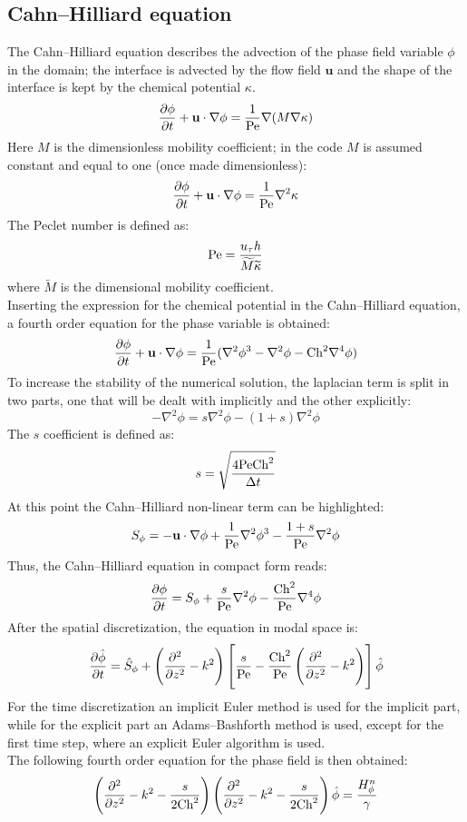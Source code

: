 \subsection{Cahn--Hilliard equation}
The Cahn--Hilliard equation describes the advection of the phase field variable $\phi$ in the domain; the interface is advected by the flow field $\mathbf{u}$ and the shape of the interface is kept by the chemical potential $\kappa$.
\begin{equation}
\frac{\partial \phi}{\partial t}+\mathbf{u}\cdot\nabla\phi=\frac{1}{\textnormal{Pe}}\nabla(M\nabla\kappa)
\end{equation}
Here $M$ is the dimensionless mobility coefficient; in the code $M$ is assumed constant and equal to one (once made dimensionless):
\[
\frac{\partial \phi}{\partial t}+\mathbf{u}\cdot\nabla\phi=\frac{1}{\textnormal{Pe}}\nabla^2\kappa
\]
The Peclet number is defined as:
\[
\textnormal{Pe}=\dfrac{u_\tau h}{\widetilde{M}\widetilde{\kappa}} 
\]
where $\widetilde{M}$ is the dimensional mobility coefficient.\\
Inserting the expression for the chemical potential in the Cahn--Hilliard equation, a fourth order equation for the phase variable is obtained:
\[
\frac{\partial \phi}{\partial t}+\mathbf{u}\cdot\nabla\phi=\frac{1}{\textnormal{Pe}}(\nabla^2\phi^3-\nabla^2\phi-\textnormal{Ch}^2\nabla^4\phi)
\]
To increase the stability of the numerical solution, the laplacian term is split in two parts, one that will be dealt with implicitly and the other explicitly:
\[
-\nabla^2\phi=s\nabla^2\phi-(1+s)\nabla^2\phi
\]
The $s$ coefficient is defined as:
\[
s=\sqrt{\frac{4\textnormal{Pe}\textnormal{Ch}^2}{\Delta t}}
\]
At this point the Cahn--Hilliard non-linear term can be highlighted:
\[
S_\phi=-\mathbf{u}\cdot\nabla\phi+\frac{1}{\textnormal{Pe}}\nabla^2\phi^3-\frac{1+s}{\textnormal{Pe}}\nabla^2\phi
\]
Thus, the Cahn--Hilliard equation in compact form reads:
\[
\frac{\partial \phi}{\partial t}=S_\phi+\frac{s}{\textnormal{Pe}}\nabla^2\phi-\frac{\textnormal{Ch}^2}{\textnormal{Pe}}\nabla^4\phi
\]
After the spatial discretization, the equation in modal space is:
\[
\frac{\partial \hat\phi}{\partial t}=\hat S_\phi +\left(\frac{\partial^2}{\partial z^2}-k^2\right)\left[\frac{s}{\textnormal{Pe}}-\frac{\textnormal{Ch}^2}{\textnormal{Pe}}\left(\frac{\partial^2}{\partial z^2}-k^2\right)\right]\hat \phi
\]
For the time discretization an implicit Euler method is used for the implicit part, while for the explicit part an Adams--Bashforth method is used, except for the first time step, where an explicit Euler algorithm is used.\\
The following fourth order equation for the phase field is then obtained:
\begin{equation}
\left(\frac{\partial^2}{\partial z^2}-k^2-\frac{s}{2\textnormal{Ch}^2}\right)\left(\frac{\partial^2}{\partial z^2}-k^2-\frac{s}{2\textnormal{Ch}^2}\right)\hat \phi=\frac{H^n_\phi}{\gamma}
\label{eq: mod_ch}
\end{equation}

